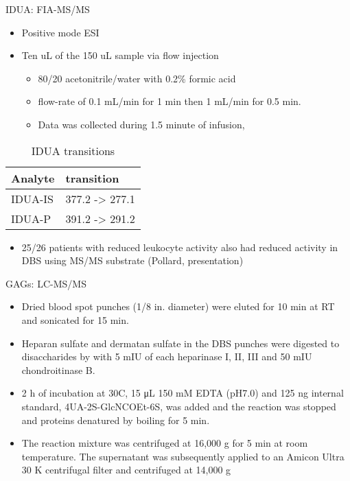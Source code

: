 \documentclass[presentation, smaller]{beamer}
\begin{document}
\begin{frame}[label={sec:orgheadline16}]{IDUA: FIA-MS/MS}
\begin{itemize}
\item Positive mode ESI
\item Ten uL of the 150 uL sample via flow injection
\begin{itemize}
\item 80/20 acetonitrile/water with 0.2\% formic acid
\item flow-rate of 0.1 mL/min for 1 min then 1 mL/min for 0.5 min.
\item Data was collected during 1.5 minute of infusion,
\end{itemize}
\end{itemize}

\begin{table}[htb]
\caption{\label{tab:mrm}
IDUA transitions}
\centering
\begin{tabular}{ll}
Analyte & transition\\
\hline
IDUA-IS & 377.2 -> 277.1\\
IDUA-P & 391.2 -> 291.2\\
\end{tabular}
\end{table}

\begin{itemize}
\item 25/26 patients with reduced leukocyte activity also had reduced
activity in DBS using MS/MS substrate (Pollard, presentation)
\end{itemize}
\end{frame}

\begin{frame}[label={sec:orgheadline17}]{GAGs: LC-MS/MS}
\begin{itemize}
\item Dried blood spot punches (1/8 in. diameter) were eluted for 10 min at RT and sonicated for 15 min.
\item Heparan sulfate and dermatan sulfate in the DBS punches were
digested to disaccharides by with 5 mIU of each heparinase I, II,
III and 50 mIU chondroitinase B.
\item 2 h of incubation at 30\degree C, 15 μL 150 mM EDTA (pH7.0) and
125 ng internal standard, 4UA-2S-GlcNCOEt-6S, was added and the
reaction was stopped and proteins denatured by boiling for 5 min.
\item The reaction mixture was centrifuged at 16,000 g for 5 min at room
temperature. The supernatant was subsequently applied to an Amicon
Ultra 30 K centrifugal filter and centrifuged at 14,000 g
\end{itemize}
\end{frame}
\end{document}
